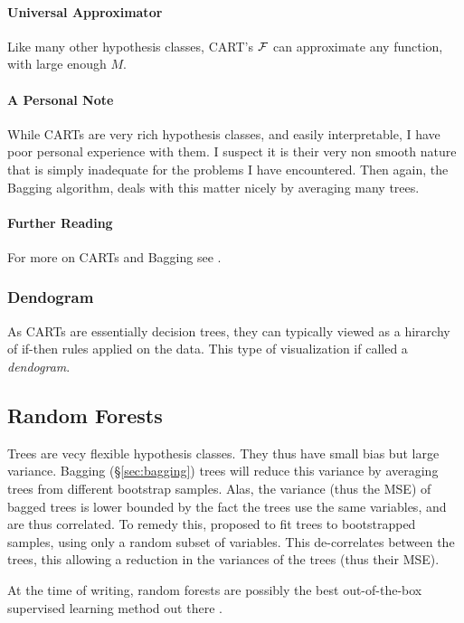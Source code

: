 \paragraph{Universal Approximator}
Like many other hypothesis classes, CART's $\mathcal{F}$ can approximate any function, with large enough $M$.


\paragraph{A Personal Note}
While CARTs are very rich hypothesis classes, and easily interpretable, I have poor personal experience with them. 
I suspect it is their very non smooth nature that is simply inadequate for the problems I have encountered.
Then again, the Bagging algorithm, deals with this matter nicely by averaging many trees.


\paragraph{Further Reading}
For more on CARTs and Bagging see \citep[Section 9]{hastie_elements_2003}.


\subsubsection{Dendogram}
\label{sec:dendogram}
As CARTs are essentially decision trees, they can typically viewed as a hirarchy of if-then rules applied on the data.
This type of visualization if called a \emph{dendogram}.





\subsection{Random Forests}
\label{sec:random_forrest}
Trees are vecy flexible hypothesis classes. 
They thus have small bias but large variance.
Bagging (\S\ref{sec:bagging}) trees will reduce this variance by averaging trees from different bootstrap samples. 
Alas, the variance (thus the MSE) of bagged trees is lower bounded by the fact the trees use the same variables, and are thus correlated. 
To remedy this, \citep{breiman_random_2001} proposed to fit trees to bootstrapped samples, using only a random subset of variables. This de-correlates between the trees, this allowing a reduction in the variances of the trees (thus their MSE).

At the time of writing, random forests are possibly the best out-of-the-box supervised learning method out there \citep{fernandez-delgado_we_2014}.

